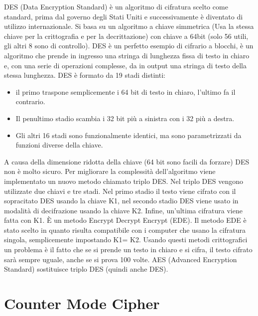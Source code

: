 DES (Data Encryption Standard) è un algoritmo di cifratura scelto come standard, prima dal governo degli Stati Uniti e successivamente è diventato di utilizzo internazionale.
Si basa su un algoritmo a chiave simmetrica (Usa la stessa chiave per la crittografia e per la decrittazione) con chiave a 64bit (solo 56 utili, gli altri 8 sono di controllo).
DES è un perfetto esempio di cifrario a blocchi, è un algoritmo che prende in ingresso una stringa di lunghezza fissa di testo in chiaro e, con una serie di operazioni complesse, da in output una stringa di testo della stessa lunghezza.
DES è formato da 19 stadi distinti:
\begin{itemize}
\item	il primo traspone semplicemente i 64 bit di testo in chiaro, l’ultimo fa il contrario.
\item	Il penultimo stadio scambia i 32 bit più a sinistra con i 32 più a destra.
\item	Gli altri 16 stadi sono funzionalmente identici, ma sono parametrizzati da funzioni diverse della chiave.
\end{itemize}
A causa della dimensione ridotta della chiave (64 bit sono facili da forzare) DES non è molto sicuro.
Per migliorare la complessità dell’algoritmo viene implementato un nuovo metodo chiamato triplo DES. Nel triplo DES vengono utilizzate due chiavi e tre stadi. Nel primo stadio il testo viene cifrato con il sopracitato DES usando la chiave K1, nel secondo stadio DES viene usato in modalità di decifrazione usando la chiave K2. Infine, un’ultima cifratura viene fatta con K1. È un metodo Encrypt Decrypt Encrypt (EDE). Il metodo EDE è stato scelto in quanto risulta compatibile con i computer che usano la cifratura singola, semplicemente impostando K1= K2.
Usando questi metodi crittografici un problema è il fatto che se si prende un testo in chiaro e si cifra, il testo cifrato sarà sempre uguale, anche se si prova 100 volte. 
AES (Advanced Encryption Standard) sostituisce triplo DES (quindi anche DES).


\section{Counter Mode Cipher}

